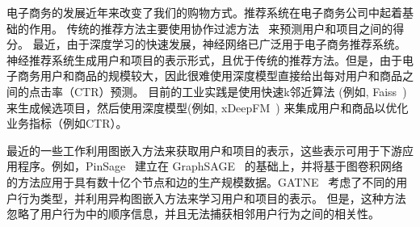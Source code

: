 
电子商务的发展近年来改变了我们的购物方式。推荐系统在电子商务公司中起着基础的作用。
传统的推荐方法主要使用协作过滤方法~\cite{sarwar2001item,schafer2007collaborative} 来预测用户和项目之间的得分。 最近，由于深度学习的快速发展，神经网络已广泛用于电子商务推荐系统。 神经推荐系统生成用户和项目的表示形式，且优于传统的推荐方法。但是，由于电子商务用户和商品的规模较大，因此很难使用深度模型直接给出每对用户和商品之间的点击率（CTR）预测。 目前的工业实践是使用快速k邻近算法 (例如, Faiss~\cite{JDH17}) 来生成候选项目，然后使用深度模型(例如, xDeepFM~\cite{lian2018xdeepfm}) 来集成用户和商品以优化业务指标（例如CTR）。


最近的一些工作利用图嵌入方法来获取用户和项目的表示，这些表示可用于下游应用程序。例如，PinSage~\cite{ying2018graph} 建立在 GraphSAGE~\cite{hamilton2017inductive} 的基础上，并将基于图卷积网络的方法应用于具有数十亿个节点和边的生产规模数据。GATNE~\cite{cen2019representation} 考虑了不同的用户行为类型，并利用异构图嵌入方法来学习用户和项目的表示。 但是，这种方法忽略了用户行为中的顺序信息，并且无法捕获相邻用户行为之间的相关性。 %

